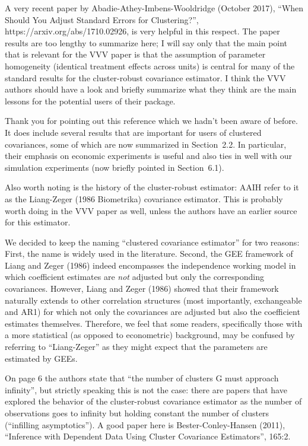 \documentclass[american,foldmarks=false]{uibklttr}
\newenvironment{review}{\fontshape{\itdefault}\fontseries{\bfdefault} \selectfont \smallskip}{\par}
\begin{document}
\begin{review}
A very recent paper by Abadie-Athey-Imbens-Wooldridge (October 2017),
``When Should You Adjust Standard Errors for Clustering?'',
https://arxiv.org/abs/1710.02926, is very helpful in this respect.  The paper
results are too lengthy to summarize here; I will say only that the main point
that is relevant for the VVV paper is that the assumption of parameter
homogeneity (identical treatment effects across units) is central for many of
the standard results for the cluster-robust covariance estimator.  I think the
VVV authors should have a look and briefly summarize what they think are the
main lessons for the potential users of their package. 
\end{review}

Thank you for pointing out this reference which we hadn't been aware of before.
It does include several results that are important for users of clustered covariances,
some of which are now summarized in Section~2.2. In particular, their emphasis on
economic experiments is useful and also ties in well with our simulation
experiments (now briefly pointed in Section~6.1).


\begin{review}
Also worth noting is the history of the cluster-robust
estimator: AAIH refer to it as the Liang-Zeger (1986 Biometrika) covariance
estimator.  This is probably worth doing in the VVV paper as well, unless the
authors have an earlier source for this estimator. 
\end{review}

We decided to keep the naming ``clustered covariance estimator'' for two
reasons: First, the name is widely used in the literature. Second, the GEE
framework of Liang and Zeger (1986) indeed encompasses the independence working
model in which coefficient estimates are \emph{not} adjusted but only the
corresponding covariances. However, Liang and Zeger (1986) showed that their
framework naturally extends to other correlation structures (most importantly,
exchangeable and AR1) for which not only the covariances are adjusted but also
the coefficient estimates themselves. Therefore, we feel that some readers,
specifically those with a more statistical (as opposed to econometric) background,
may be confused by referring to ``Liang-Zeger'' as they might expect that the
parameters are estimated by GEEs.


\begin{review}
On page 6 the authors state that ``the number of clusters G must
approach infinity'', but strictly speaking this is not the case: there are
papers that have explored the behavior of the cluster-robust covariance
estimator as the number of observations goes to infinity but holding constant
the number of clusters (``infilling asymptotics'').  A good paper here is
Bester-Conley-Hansen (2011), ``Inference with Dependent Data Using Cluster
Covariance Estimators'', 165:2. 
\end{review}
\end{document}

